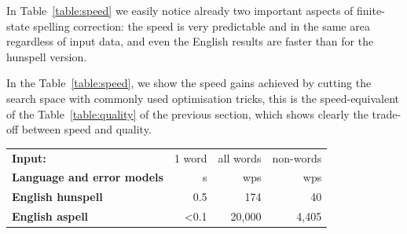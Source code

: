 \documentclass[a4paper,12pt]{article}
\begin{document}
In Table~\ref{table:speed} we easily notice already two important aspects of
finite-state spelling correction: the speed is very predictable and in the same
area regardless of input data, and even the English results are faster than for
the hunspell version. 

In the Table~\ref{table:speed}, we show the speed gains achieved by
cutting the search space with commonly used optimisation tricks, this is the
speed-equivalent of the Table~\ref{table:quality} of the previous
section, which shows clearly the trade-off between speed and quality.

\begin{table}
    \centering
    \begin{tabular}{|l|r|r|r|}
        \hline
        \bf Input:                    & 1 word & all words & non-words \\
        \bf Language and error models & s      & wps       & wps       \\
        \hline
        \bf English hunspell & 0.5 & 174 & 40 \\
          \bf English aspell & <0.1 & 20,000 & 4,405 \\


\end{tabular}
\end{table}
\end{document}
